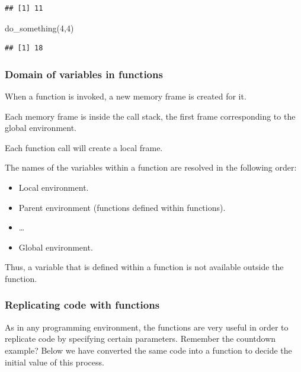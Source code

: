 \documentclass[
]{book}
\newenvironment{Shaded}{\begin{snugshade}}{\end{snugshade}}
\newcommand{\DecValTok}[1]{\textcolor[rgb]{0.00,0.00,0.81}{#1}}
\newcommand{\FunctionTok}[1]{\textcolor[rgb]{0.00,0.00,0.00}{#1}}
\newcommand{\NormalTok}[1]{#1}
\providecommand{\tightlist}{%
  \setlength{\itemsep}{0pt}\setlength{\parskip}{0pt}}
\begin{document}
\begin{verbatim}
## [1] 11
\end{verbatim}

\begin{Shaded}
\begin{Highlighting}[]
\FunctionTok{do\_something}\NormalTok{(}\DecValTok{4}\NormalTok{,}\DecValTok{4}\NormalTok{)}
\end{Highlighting}
\end{Shaded}

\begin{verbatim}
## [1] 18
\end{verbatim}

\hypertarget{domain-of-variables-in-functions}{%
\subsubsection{Domain of variables in functions}\label{domain-of-variables-in-functions}}

When a function is invoked, a new memory frame is created for it.

Each memory frame is inside the call stack, the first frame corresponding to the global environment.

Each function call will create a local frame.

The names of the variables within a function are resolved in the following order:

\begin{itemize}
\tightlist
\item
  Local environment.
\item
  Parent environment (functions defined within functions).
\item
  \ldots{}
\item
  Global environment.
\end{itemize}

Thus, a variable that is defined within a function is not available outside the function.

\hypertarget{replicating-code-with-functions}{%
\subsubsection{Replicating code with functions}\label{replicating-code-with-functions}}

As in any programming environment, the functions are very useful in order to replicate code by specifying certain parameters. Remember the countdown example? Below we have converted the same code into a function to decide the initial value of this process.
\end{document}

